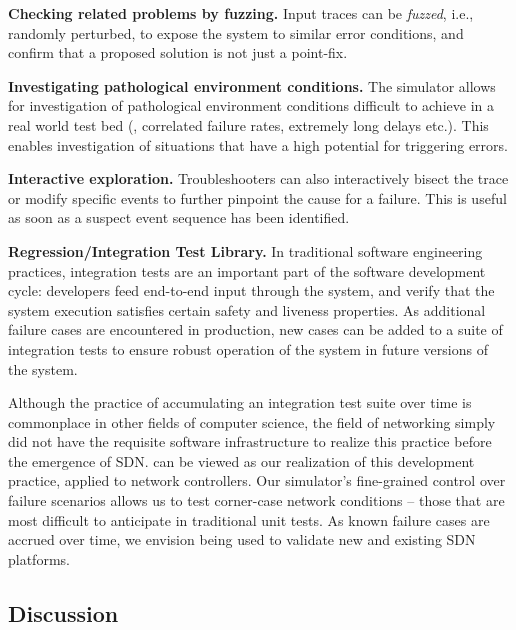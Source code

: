 \noindent\textbf{Checking related problems by fuzzing.} Input traces can be \emph{fuzzed}, i.e.,
randomly perturbed, to expose the system to similar error conditions, and confirm
that a proposed solution is not just a point-fix. 


\noindent\textbf{Investigating pathological environment conditions.} The simulator allows for investigation
of pathological environment conditions difficult to achieve in a real world test bed
(\eg{}, correlated failure rates, extremely long delays etc.). This enables
investigation of situations that have a high potential for triggering errors.

\noindent\textbf{Interactive exploration.} Troubleshooters can also interactively bisect
the trace or modify specific events to further pinpoint the cause for a failure.
This is useful as soon as a suspect event sequence has been identified.

\noindent\textbf{Regression/Integration Test Library.} In traditional software engineering practices,
integration tests are an
important part of the software development cycle: developers feed end-to-end
input through the system, and verify that the system execution satisfies
certain safety and liveness properties. As additional failure cases are encountered in
production, new cases can be added to a suite of integration tests to
ensure robust operation of the system in future versions of the system.

Although the practice of accumulating an integration test suite over time is
commonplace in other fields of computer science, the field of networking
simply did not have the requisite software infrastructure to realize this practice before the emergence
of SDN. \Simulator{} can be viewed as our realization
of this development practice, applied to network controllers. Our simulator's fine-grained control over
failure scenarios allows us to test corner-case network conditions -- those
that are most difficult to anticipate in traditional unit tests.
As known failure cases are accrued over time, we envision \simulator{} being used to validate
new and existing SDN platforms.

\subsection{Discussion}


